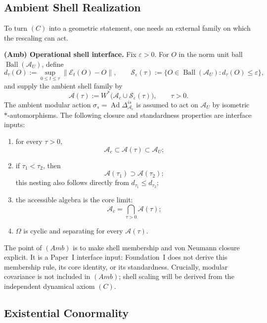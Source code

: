 \documentclass[12pt]{article}
\theoremstyle{definition}
\theoremstyle{remark}
\newcommand{\tightlist}{%
  \setlength{\itemsep}{0pt}\setlength{\parskip}{0pt}}
\begin{document}
\subsection{Ambient Shell Realization}\label{ambient-shell-realization}

To turn \((C)\) into a geometric statement, one needs an external family
on which the rescaling can act.

\textbf{(Amb) Operational shell interface.}
Fix \(\varepsilon>0\). For \(O\) in the norm unit ball
\(\operatorname{Ball}(\mathcal{A}_U)\), define
\[
d_\tau(O):=\sup_{0\le t\le\tau}
\|\mathcal{E}_t(O)-O\|,
\qquad
\mathcal{S}_\varepsilon(\tau)
:=\{O\in\operatorname{Ball}(\mathcal{A}_U):d_\tau(O)\le\varepsilon\},
\]
and supply the ambient shell family by
\[
\mathcal{A}(\tau)
:=W^*\!\big(\mathcal{A}_c\cup\mathcal{S}_\varepsilon(\tau)\big),
\qquad \tau>0.
\]
The ambient modular action
\(\sigma_s=\operatorname{Ad}\Delta_{\mathcal{A}_c}^{is}\) is assumed to
act on \(\mathcal{A}_U\) by isometric \(*\)-automorphisms. The following
closure and standardness properties are interface inputs:

\begin{enumerate}
\def\labelenumi{\arabic{enumi}.}
\tightlist
\item
  for every \(\tau>0\), \[
  \mathcal{A}_c\subset \mathcal{A}(\tau)\subset \mathcal{A}_U;
  \]
\item
  if \(\tau_1<\tau_2\), then \[
  \mathcal{A}(\tau_1)\supset \mathcal{A}(\tau_2);
  \] this nesting also follows directly from
  \(d_{\tau_1}\le d_{\tau_2}\);
\item
  the accessible algebra is the core limit: \[
  \mathcal{A}_c=\bigcap_{\tau>0}\mathcal{A}(\tau);
  \]
\item
  \(\Omega\) is cyclic and separating for every
  \(\mathcal{A}(\tau)\).
\end{enumerate}

The point of \((Amb)\) is to make shell membership and von Neumann
closure explicit. It is a Paper~I interface input: Foundation~I does not
derive this membership rule, its core identity, or its standardness.
Crucially, modular covariance is not included in \((Amb)\); shell scaling
will be derived from the independent dynamical axiom \((C)\).

\subsection{Existential Conormality}\label{existential-conormality}
\end{document}
